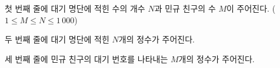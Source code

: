 첫 번째 줄에 대기 명단에 적힌 수의 개수 $N$과 민규 친구의 수 $M$이 주어진다. ($1 \le M \le N \le 1\,000$) 

두 번째 줄에 대기 명단에 적힌 $N$개의 정수가 주어진다.

세 번째 줄에 민규 친구의 대기 번호를 나타내는 $M$개의 정수가 주어진다.

